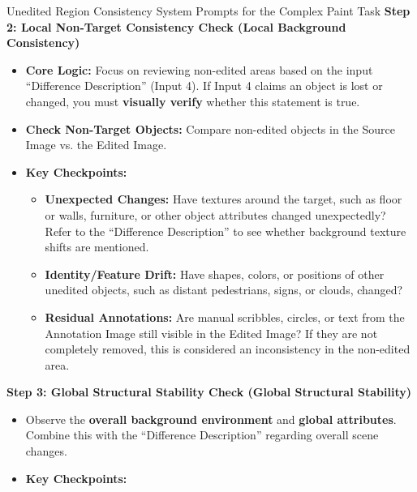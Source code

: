 \documentclass{llmxive}
\begin{document}
\begin{promptbox}[label={System Prompts: URC_Complex_paint}]{Unedited Region Consistency System Prompts for the Complex Paint Task}
\textbf{Step 2: Local Non-Target Consistency Check (Local Background Consistency)}

\begin{itemize}[leftmargin=2.2em, labelsep=0.5em, itemsep=2pt]
    \item \textbf{Core Logic:} Focus on reviewing non-edited areas based on the input ``Difference Description'' (Input 4). If Input 4 claims an object is lost or changed, you must \textbf{visually verify} whether this statement is true.
    
    \item \textbf{Check Non-Target Objects:} Compare non-edited objects in the Source Image vs. the Edited Image.
    
    \item \textbf{Key Checkpoints:}
    
    \begin{itemize}[leftmargin=2.2em, labelsep=0.5em, itemsep=2pt]
        \item \textbf{Unexpected Changes:} Have textures around the target, such as floor or walls, furniture, or other object attributes changed unexpectedly? Refer to the ``Difference Description'' to see whether background texture shifts are mentioned.
        
        \item \textbf{Identity/Feature Drift:} Have shapes, colors, or positions of other unedited objects, such as distant pedestrians, signs, or clouds, changed?
        
        \item \textbf{Residual Annotations:} Are manual scribbles, circles, or text from the Annotation Image still visible in the Edited Image? If they are not completely removed, this is considered an inconsistency in the non-edited area.
    \end{itemize}
\end{itemize}

\medskip

\textbf{Step 3: Global Structural Stability Check (Global Structural Stability)}

\begin{itemize}[leftmargin=2.2em, labelsep=0.5em, itemsep=2pt]
    \item Observe the \textbf{overall background environment} and \textbf{global attributes}. Combine this with the ``Difference Description'' regarding overall scene changes.
    
    \item \textbf{Key Checkpoints:}
    

\end{itemize}
\end{promptbox}
\end{document}
